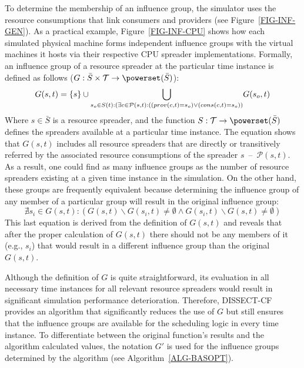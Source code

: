\documentclass[sort, compress, 5p]{elsarticle}
\newcommand{\SIMULATIONTIMEM}{\mathcal{T}}
\begin{document}
To determine the membership of an influence group, the simulator uses the resource consumptions that link consumers and providers (see Figure~\ref{FIG-INF-GEN}). As a practical example, Figure~\ref{FIG-INF-CPU} shows how each simulated physical machine forms independent influence groups with the virtual machines it hosts via their respective CPU spreader implementations. Formally, an influence group of a resource spreader at the particular time instance is defined as follows ($G:  \bar{S} \times \SIMULATIONTIMEM\to \powerset(\bar{S})$):
\begin{equation}\small
G(s,t)=\{s\} \cup{\underset{s_o\in S(t):(\exists c\in \mathcal{P}(s,t):((prov(c,t)=s_o) \lor (cons(c,t)=s_o))}{\bigcup}G(s_o,t)}
\end{equation}
Where  $s \in \bar{S}$  is a resource spreader, and the function $S: \SIMULATIONTIMEM \to \powerset(\bar{S})$ defines the spreaders available at a particular time instance. The equation shows that $G(s,t)$ includes all resource spreaders that are directly or transitively referred by the associated resource consumptions of the spreader $s$~--~$\mathcal{P}(s,t)$.  As a result, one could find as many influence groups as the number of resource spreaders existing at a given time instance in the simulation. On the other hand, these groups are frequently equivalent because determining the influence group of any member of a particular group will result in the original influence group:
\begin{equation}
\nexists s_i\in G(s,t): (G(s,t)\backslash G(s_i,t)\neq\emptyset \land G(s_i,t)\backslash G(s,t)\neq\emptyset)
\end{equation}
This last equation is derived from the definition of $G(s,t)$ and reveals that after the proper calculation of $G(s,t)$ there should not be any members of it (e.g., $s_i$) that would result in a different influence group than the original $G(s,t)$.

Although the definition of $G$ is quite straightforward, its evaluation in all necessary time instances for all relevant resource spreaders would result in significant simulation performance deterioration. Therefore, DISSECT-CF provides an algorithm that significantly reduces the use of $G$ but still ensures that the influence groups are available for the scheduling logic in every time instance. To differentiate between the original function's results and the algorithm calculated values, the notation $G'$ is used for the influence groups determined by the algorithm (see Algorithm~\ref{ALG-BASOPT}).
\end{document}
